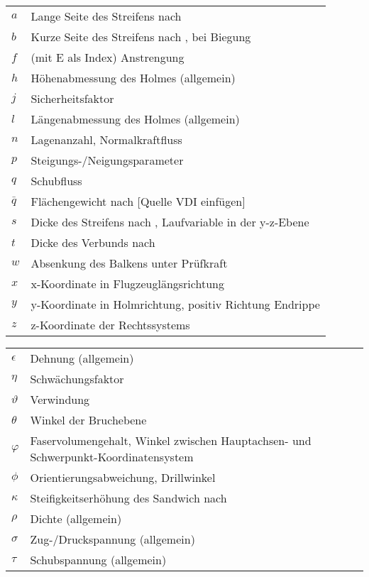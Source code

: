 \begin{table}[h]
	\begin{tabular}{ll}
		$ a $&Lange Seite des Streifens nach \cite{item1}\\
		$ b $&Kurze Seite des Streifens nach \cite{item1}, bei Biegung\\
		$ f $&(mit E als Index) Anstrengung\\
		$ h $&Höhenabmessung des Holmes (allgemein)\\
		$ j $&Sicherheitsfaktor\\
		$ l $&Längenabmessung des Holmes (allgemein)\\
		$ n $&Lagenanzahl, Normalkraftfluss\\
		$ p $&Steigungs-/Neigungsparameter\\
		$ q $&Schubfluss\\
		$ \bar{q} $&Flächengewicht nach [Quelle VDI einfügen]\\
		$ s $&Dicke des Streifens nach \cite{item1}, Laufvariable in der	y-z-Ebene\\
		$ t $&Dicke des Verbunds nach \cite{item3}\\
		$ w $&Absenkung des Balkens unter Prüfkraft\\
		$ x $&x-Koordinate in Flugzeuglängsrichtung\\
		$ y $&y-Koordinate in Holmrichtung, positiv Richtung Endrippe\\
		$ z $&z-Koordinate der Rechtssystems\\
		
	\end{tabular}
\end{table}

\begin{table}[h]
	\begin{tabular}{ll}
		$ \epsilon $&Dehnung (allgemein)\\
		$ \eta $&Schwächungsfaktor\\
		$ \vartheta $&Verwindung\\
		$ \theta $ &Winkel der Bruchebene\\
		$ \varphi $&Faservolumengehalt, Winkel zwischen Hauptachsen- und Schwerpunkt-Koordinatensystem\\
		$ \phi $&Orientierungsabweichung, Drillwinkel\\
		$ \kappa $&Steifigkeitserhöhung des Sandwich nach \cite{item1}\\
		$ \rho $&Dichte (allgemein)\\
		$ \sigma $&Zug-/Druckspannung (allgemein)\\
		$ \tau $&Schubspannung (allgemein)\\
	\end{tabular}
\end{table}

